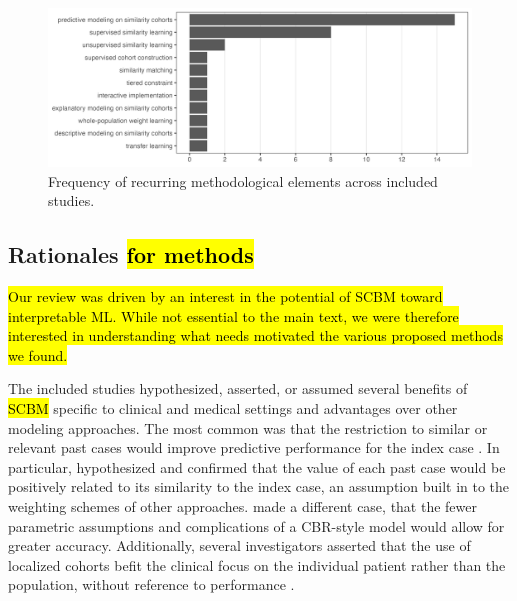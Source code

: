 \documentclass[sn-mathphys,Numbered,pdflatex]{sn-jnl}
\theoremstyle{remark}
\theoremstyle{definition}
\begin{document}
\begin{figure}

{\centering \includegraphics[width=1\linewidth]{Fig4} 

}

\caption{Frequency of recurring methodological elements across included studies.}\label{fig:methods}
\end{figure}

\subsection{\texorpdfstring{Rationales\hl{ for methods}}{Rationales}}\label{rationales}

\hl{Our review was driven by an interest in the potential of SCBM toward interpretable ML. While not essential to the main text, we were therefore interested in understanding what needs motivated the various proposed methods we found.}

The included studies hypothesized, asserted, or assumed several benefits
of \hl{SCBM} specific to clinical and medical settings and advantages
over other modeling approaches. The most common was that the restriction
to similar or relevant past cases would improve predictive performance
for the index case \citep{Mariuzzi1997, Liang2015, Ng2015, Lee2017}. In
particular, \citet{Lee2015} hypothesized and confirmed that the value of
each past case would be positively related to its similarity to the
index case, an assumption built in to the weighting schemes of other
approaches. \citet{Lowsky2013} made a different case, that the fewer
parametric assumptions and complications of a CBR-style model would
allow for greater accuracy. Additionally, several investigators asserted
that the use of localized cohorts befit the clinical focus on the
individual patient rather than the population, without reference to
performance \citep{Song2006, Xu2008}.
\end{document}
